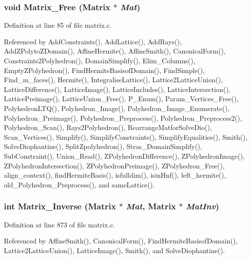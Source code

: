 \subsubsection{\setlength{\rightskip}{0pt plus 5cm}void Matrix\_\-Free (Matrix $\ast$ {\em Mat})}\label{matrix_8c_a1}




Definition at line 85 of file matrix.c.

Referenced by Add\-Constraints(), Add\-Lattice(), Add\-Rays(), Add\-ZPolyto\-ZDomain(), Affine\-Hermite(), Affine\-Smith(), Canonical\-Form(), Constraints2Polyhedron(), Domain\-Simplify(), Elim\_\-Columns(), Empty\-ZPolyhedron(), Find\-Hermite\-Basisof\-Domain(), Find\-Simple(), Find\_\-m\_\-faces(), Hermite(), Integralise\-Lattice(), Lattice2Lattice\-Union(), Lattice\-Difference(), Lattice\-Image(), Lattice\-Includes(), Lattice\-Intersection(), Lattice\-Preimage(), Lattice\-Union\_\-Free(), P\_\-Enum(), Param\_\-Vertices\_\-Free(), Polyhedron\-LTQ(), Polyhedron\_\-Image(), Polyhedron\_\-Image\_\-Enumerate(), Polyhedron\_\-Preimage(), Polyhedron\_\-Preprocess(), Polyhedron\_\-Preprocess2(), Polyhedron\_\-Scan(), Rays2Polyhedron(), Rearrange\-Matfor\-Solve\-Dio(), Scan\_\-Vertices(), Simplify(), Simplify\-Constraints(), Simplify\-Equalities(), Smith(), Solve\-Diophantine(), Split\-Zpolyhedron(), Stras\_\-Domain\-Simplify(), Sub\-Constraint(), Union\_\-Read(), ZPolyhedron\-Difference(), ZPolyhedron\-Image(), ZPolyhedron\-Intersection(), ZPolyhedron\-Preimage(), ZPolyhedron\_\-Free(), align\_\-context(), find\-Hermite\-Basis(), isfulldim(), isin\-Hnf(), left\_\-hermite(), old\_\-Polyhedron\_\-Preprocess(), and same\-Lattice().

\subsubsection{\setlength{\rightskip}{0pt plus 5cm}int Matrix\_\-Inverse (Matrix $\ast$ {\em Mat}, Matrix $\ast$ {\em Mat\-Inv})}\label{matrix_8c_a13}




Definition at line 873 of file matrix.c.

Referenced by Affine\-Smith(), Canonical\-Form(), Find\-Hermite\-Basisof\-Domain(), Lattice2Lattice\-Union(), Lattice\-Image(), Smith(), and Solve\-Diophantine().

